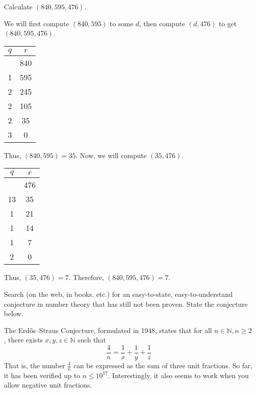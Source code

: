 \documentclass{article}
\begin{document}
\begin{problem}{}{}
    Calculate $(840,595,476)$.
\end{problem}
\begin{solution}{}{}
    We will first compute $(840,595)$ to some $d$, then compute $(d,476)$ to get $(840,595,476)$.
    \begin{center}
        \begin{tabular}{c c}
        $q$ & $r$\\
        \hline
        & 840 \\
        1 & 595 \\
        2 & 245 \\
        2 & 105 \\
        2 & 35 \\
        3 & 0 \\
        \end{tabular}
    \end{center} 
    Thus, $(840,595)=35$. Now, we will compute $(35,476)$.
    \begin{center}
        \begin{tabular}{c c}
        $q$ & $r$\\
        \hline
        & 476 \\
        13 & 35 \\
        1 & 21 \\
        1 & 14 \\
        1 & 7 \\
        2 & 0 \\
        \end{tabular}
    \end{center}
    Thus, $(35,476)=7$. Therefore, $(840,595,476)=7$.
\end{solution}

\begin{problem}{}{}
    Search (on the web, in books, etc.) for an easy-to-state, easy-to-understand conjecture in number theory that has still not been proven. State the conjecture below.
\end{problem}
\begin{solution}{}{}
    The Erdős–Straus Conjecture, formulated in 1948, states that for all $n\in\mathbb{N},n\geq 2$, there exists $x,y,z\in\mathbb{N}$ such that
    \[\frac{4}{n}=\frac{1}{x}+\frac{1}{y}+\frac{1}{z}\]
    That is, the number $\frac{4}{n}$ can be expressed as the sum of three unit fractions. So far, it has been verified up to $n\leq 10^{17}$. Interestingly, it also seems to work when you allow negative unit fractions.
\end{solution}
\end{document}
